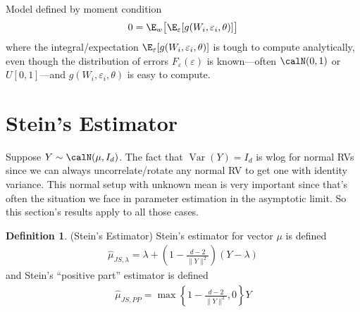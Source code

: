 \documentclass[12pt]{article}
\theoremstyle{plain}
\theoremstyle{definition}
\newtheorem{defn}[thm]{Definition}
\theoremstyle{remark}
\newcommand{\Var}{\operatorname{Var}}
\begin{document}
Model defined by moment condition
\begin{align*}
  0 = \E_w\big[\E_\varepsilon[g(W_i,\varepsilon_i,\theta)]\big]
\end{align*}
where the integral/expectation
$\E_\varepsilon[g(W_i,\varepsilon_i,\theta)]$ is tough to compute
analytically, even though the distribution of errors
$F_\varepsilon(\varepsilon)$ is known---often $\calN(0,1)$ or
$U[0,1]$---and $g(W_i,\varepsilon_i,\theta)$ is easy to compute.


\clearpage
\section{Stein's Estimator}

Suppose $Y \sim \calN(\mu,I_d)$.
The fact that $\Var(Y)=I_d$ is wlog for normal RVs since we can always
uncorrelate/rotate any normal RV to get one with identity variance.
This normal setup with unknown mean is very important since that's often
the situation we face in parameter estimation in the asymptotic limit.
So this section's results apply to all those cases.

\begin{defn}(Stein's Estimator)
Stein's estimator for vector $\mu$ is defined
\begin{align*}
  \hat{\mu}_{JS,\lambda}
  =
  \lambda
  +
  \left(
  1-
  \frac{d-2}{\lVert Y\rVert^2}
  \right)
  (Y-\lambda)
\end{align*}
and Stein's ``positive part'' estimator is defined
\begin{align*}
  \hat{\mu}_{JS,PP}
  =
  \max
  \left\{
  1-
  \frac{d-2}{\lVert Y\rVert^2}
  ,0
  \right\}
  Y
\end{align*}
\end{defn}
\end{document}
